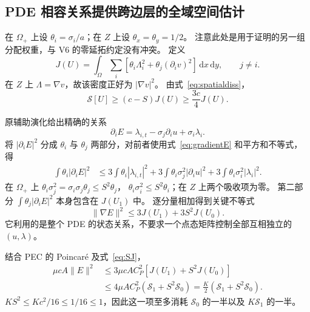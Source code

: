 \documentclass[UTF8,a4paper,11pt,fontset=none]{ctexart}
\numberwithin{equation}{section}
\theoremstyle{definition}
\theoremstyle{definition}
\newcommand{\Om}{\Omega}
\newcommand{\dd}{\,\mathrm d}
\newcommand{\Sc}{\mathscr S}
\begin{document}
\subsection{PDE 相容关系提供跨边层的全域空间估计}
在 $\Om_+$ 上设 $\theta_i=\sigma_i/a$；在 $Z$ 上设 $\theta_x=\theta_y=1/2$。
注意此处是用于证明的另一组分配权重，与 V6 的零延拓约定没有冲突。
定义
\begin{equation}\label{eq:J}
 J(U)=\int_\Om\sum_i[\theta_i\Lambda_i^2+\theta_j(\partial_iv)^2]\dd x\dd y,
 \qquad j\ne i.
\end{equation}
在 $Z$ 上 $\Lambda=\nabla v$，故该密度正好为 $|\nabla v|^2$。
由式~\eqref{eq:spatialdiss}，
\begin{equation}\label{eq:SJ}
 \Sc[U]\ge(c-S)J(U)\ge\frac{3c}4J(U).
\end{equation}

原辅助演化给出精确的关系
\begin{equation}\label{eq:gradientE}
 \partial_iE=\lambda_{i,t}-\sigma_j\partial_i u+\sigma_i\lambda_i.
\end{equation}
将 $|\partial_iE|^2$ 分成 $\theta_i$ 与 $\theta_j$ 两部分，对前者使用式~\eqref{eq:gradientE} 和平方和不等式，得
\[
\begin{aligned}
 \int\theta_i|\partial_iE|^2
 &\le3\int\theta_i|\lambda_{i,t}|^2
 +3\int\theta_i\sigma_j^2|\partial_i u|^2
 +3\int\theta_i\sigma_i^2|\lambda_i|^2.
\end{aligned}
\]
在 $\Om_+$ 上
$\theta_i\sigma_j^2=\sigma_i\sigma_j\theta_j\le S^2\theta_j$，
$\theta_i\sigma_i^2\le S^2\theta_i$；在 $Z$ 上两个吸收项为零。
第二部分 $\int\theta_j|\partial_iE|^2$ 本身包含在 $J(U_1)$ 中。
逐分量相加得到关键不等式
\begin{equation}\label{eq:globalgradient}
 \boxed{\|\nabla E\|^2\le3J(U_1)+3S^2J(U_0).}
\end{equation}
它利用的是整个 PDE 的状态关系，不要求一个点态矩阵控制全部互相独立的 $(u,\lambda)$。

结合 PEC 的 Poincar\'e 及式~\eqref{eq:SJ}，
\begin{equation}\label{eq:absorbE}
\begin{aligned}
 \mu cA\|E\|^2
 &\le3\mu cAC_P^2[J(U_1)+S^2J(U_0)]\\
 &\le4\mu AC_P^2(\Sc_1+S^2\Sc_0)
 =\frac K2(\Sc_1+S^2\Sc_0).
\end{aligned}
\end{equation}
$KS^2\le Kc^2/16\le1/16\le1$，因此这一项至多消耗 $\Sc_0$ 的一半以及 $K\Sc_1$ 的一半。
\end{document}
